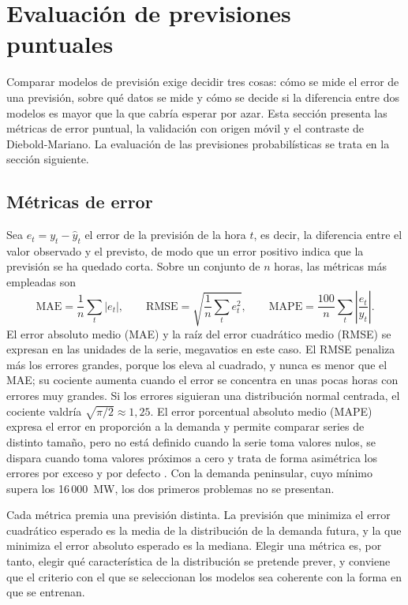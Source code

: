 \section{Evaluación de previsiones puntuales}\label{sec:evaluacion}

Comparar modelos de previsión exige decidir tres cosas: cómo se mide el
error de una previsión, sobre qué datos se mide y cómo se decide si la
diferencia entre dos modelos es mayor que la que cabría esperar por azar.
Esta sección presenta las métricas de error puntual, la validación con origen
móvil y el contraste de Diebold-Mariano. La evaluación de las previsiones
probabilísticas se trata en la sección siguiente.

\subsection{Métricas de error}\label{sec:metricas}

Sea $e_t = y_t - \hat{y}_t$ el error de la previsión de la hora $t$, es
decir, la diferencia entre el valor observado y el previsto, de modo que un
error positivo indica que la previsión se ha quedado corta. Sobre un
conjunto de $n$ horas, las métricas más empleadas son
\begin{equation}
	\mathrm{MAE} = \frac{1}{n}\sum_{t} |e_t|,
	\qquad
	\mathrm{RMSE} = \sqrt{\frac{1}{n}\sum_{t} e_t^2},
	\qquad
	\mathrm{MAPE} = \frac{100}{n}\sum_{t} \left|\frac{e_t}{y_t}\right|.
\end{equation}
El error absoluto medio (MAE) y la raíz del error cuadrático medio (RMSE) se
expresan en las unidades de la serie, megavatios en este caso. El RMSE
penaliza más los errores grandes, porque los eleva al cuadrado, y nunca es
menor que el MAE; su cociente aumenta cuando el error se concentra en unas
pocas horas con errores muy grandes. Si los errores siguieran una
distribución normal centrada, el cociente valdría $\sqrt{\pi/2} \approx 1{,}25$.
El error porcentual absoluto medio (MAPE) expresa el error en proporción a la
demanda y permite comparar series de distinto tamaño, pero no está definido
cuando la serie toma valores nulos, se dispara cuando toma valores próximos
a cero y trata de forma asimétrica los errores por exceso y por defecto
\parencite{hyndman2006another}. Con la demanda peninsular, cuyo mínimo supera
los 16\,000~MW, los dos primeros problemas no se presentan.

Cada métrica premia una previsión distinta. La previsión que minimiza el
error cuadrático esperado es la media de la distribución de la demanda
futura, y la que minimiza el error absoluto esperado es la mediana. Elegir
una métrica es, por tanto, elegir qué característica de la distribución se
pretende prever, y conviene que el criterio con el que se seleccionan los
modelos sea coherente con la forma en que se entrenan.

